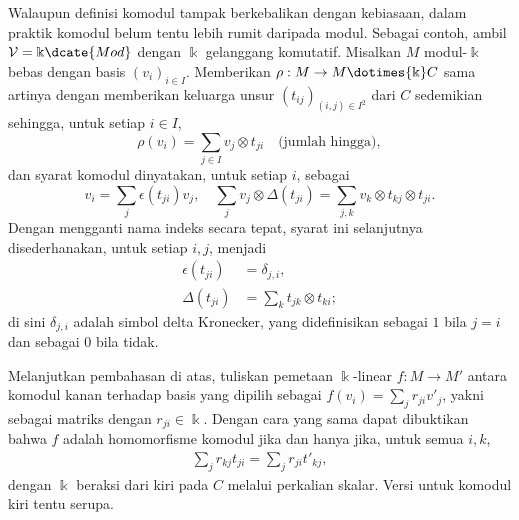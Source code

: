 Walaupun definisi komodul tampak berkebalikan dengan kebiasaan, dalam praktik
komodul belum tentu lebih rumit daripada modul. Sebagai contoh, ambil
$\mathcal{V}=\Bbbk\dcate{Mod}$ dengan $\Bbbk$ gelanggang komutatif. Misalkan
$M$ modul-$\Bbbk$ bebas dengan basis $(v_i)_{i\in I}$. Memberikan
$\rho:M\to M\dotimes{\Bbbk}C$ sama artinya dengan memberikan keluarga unsur
$(t_{ij})_{(i,j)\in I^2}$ dari $C$ sedemikian sehingga, untuk setiap $i\in I$,
\begin{equation*}
	\rho(v_i) = \sum_{j \in I} v_j \otimes t_{ji} \quad \text{(jumlah hingga)},
\end{equation*}
dan syarat komodul dinyatakan, untuk setiap $i$, sebagai
\begin{equation*}
	v_i = \sum_j \epsilon(t_{ji}) v_j, \quad \sum_j v_j \otimes \Delta(t_{ji}) = \sum_{j, k} v_k \otimes t_{kj}  \otimes t_{ji}.
\end{equation*}
Dengan mengganti nama indeks secara tepat, syarat ini selanjutnya
disederhanakan, untuk setiap $i,j$, menjadi
\begin{equation}\label{eqn:comodule-matrix}
	\begin{aligned}
		\epsilon(t_{ji}) & = \delta_{j, i}, \\
		\Delta(t_{ji}) & = \sum_k t_{jk} \otimes t_{ki};
	\end{aligned}
\end{equation}
di sini $\delta_{j,i}$ adalah simbol delta Kronecker, yang didefinisikan
sebagai $1$ bila $j=i$ dan sebagai $0$ bila tidak.

Melanjutkan pembahasan di atas, tuliskan pemetaan $\Bbbk$-linear
$f:M\to M'$ antara komodul kanan terhadap basis yang dipilih sebagai
$f(v_i)=\sum_jr_{ji}v'_j$, yakni sebagai matriks dengan
$r_{ji}\in\Bbbk$. Dengan cara yang sama dapat dibuktikan bahwa $f$ adalah
homomorfisme komodul jika dan hanya jika, untuk semua $i,k$,
\begin{equation*}\begin{gathered}
	\sum_j r_{kj} t_{ji} = \sum_j r_{ji} t'_{kj},
\end{gathered}\end{equation*}
dengan $\Bbbk$ beraksi dari kiri pada $C$ melalui perkalian skalar. Versi
untuk komodul kiri tentu serupa.

